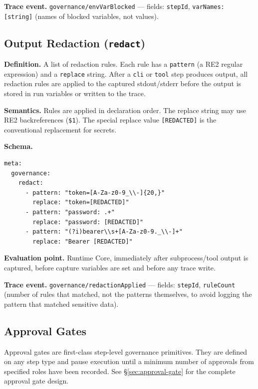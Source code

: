 \textbf{Trace event.} \texttt{governance/envVarBlocked} — fields: \texttt{stepId},
\texttt{varNames: [string]} (names of blocked variables, not values).

\subsection{Output Redaction (\texttt{redact})}

\textbf{Definition.} A list of redaction rules. Each rule has a \texttt{pattern} (a RE2
regular expression) and a \texttt{replace} string. After a \texttt{cli} or \texttt{tool}
step produces output, all redaction rules are applied to the captured stdout/stderr before
the output is stored in run variables or written to the trace.

\textbf{Semantics.} Rules are applied in declaration order. The replace string may use RE2
backreferences (\texttt{\$1}). The special replace value \texttt{[REDACTED]} is the
conventional replacement for secrets.

\textbf{Schema.}
\begin{verbatim}
meta:
  governance:
    redact:
      - pattern: "token=[A-Za-z0-9_\\-]{20,}"
        replace: "token=[REDACTED]"
      - pattern: "password: .+"
        replace: "password: [REDACTED]"
      - pattern: "(?i)bearer\\s+[A-Za-z0-9._\\-]+"
        replace: "Bearer [REDACTED]"
\end{verbatim}

\textbf{Evaluation point.} Runtime Core, immediately after subprocess/tool output is captured,
before capture variables are set and before any trace write.

\textbf{Trace event.} \texttt{governance/redactionApplied} — fields: \texttt{stepId},
\texttt{ruleCount} (number of rules that matched, not the patterns themselves, to avoid
logging the pattern that matched sensitive data).

\subsection{Approval Gates}

Approval gates are first-class step-level governance primitives. They are defined on any step
type and pause execution until a minimum number of approvals from specified roles have been
recorded. See §\ref{sec:approval-gate} for the complete approval gate design.

